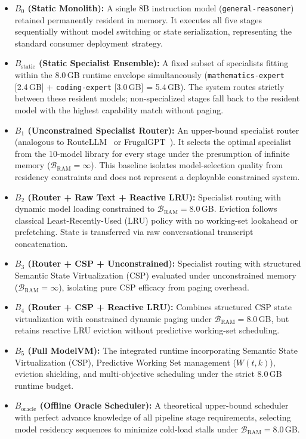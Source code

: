 \begin{itemize}
    \item \textbf{$B_0$ (Static Monolith):} A single 8B instruction model (\texttt{general-reasoner}) retained permanently resident in memory. It executes all five stages sequentially without model switching or state serialization, representing the standard consumer deployment strategy.
    \item \textbf{$B_{\text{static}}$ (Static Specialist Ensemble):} A fixed subset of specialists fitting within the 8.0\,GB runtime envelope simultaneously (\texttt{mathematics-expert} [2.4\,GB] + \texttt{coding-expert} [3.0\,GB] = 5.4\,GB). The system routes strictly between these resident models; non-specialized stages fall back to the resident model with the highest capability match without paging.
    \item \textbf{$B_1$ (Unconstrained Specialist Router):} An upper-bound specialist router (analogous to RouteLLM~\cite{ong2024routellm} or FrugalGPT~\cite{chen2023frugalgpt}). It selects the optimal specialist from the 10-model library for every stage under the presumption of infinite memory ($\mathcal{B}_{\text{RAM}} = \infty$). This baseline isolates model-selection quality from residency constraints and does not represent a deployable constrained system.
    \item \textbf{$B_2$ (Router + Raw Text + Reactive LRU):} Specialist routing with dynamic model loading constrained to $\mathcal{B}_{\text{RAM}} = 8.0$\,GB. Eviction follows classical Least-Recently-Used (LRU) policy with no working-set lookahead or prefetching. State is transferred via raw conversational transcript concatenation.
    \item \textbf{$B_3$ (Router + CSP + Unconstrained):} Specialist routing with structured Semantic State Virtualization (CSP) evaluated under unconstrained memory ($\mathcal{B}_{\text{RAM}} = \infty$), isolating pure CSP efficacy from paging overhead.
    \item \textbf{$B_4$ (Router + CSP + Reactive LRU):} Combines structured CSP state virtualization with constrained dynamic paging under $\mathcal{B}_{\text{RAM}} = 8.0$\,GB, but retains reactive LRU eviction without predictive working-set scheduling.
    \item \textbf{$B_5$ (Full ModelVM):} The integrated runtime incorporating Semantic State Virtualization (CSP), Predictive Working Set management ($W(t, k)$), eviction shielding, and multi-objective scheduling under the strict 8.0\,GB runtime budget.
    \item \textbf{$B_{\text{oracle}}$ (Offline Oracle Scheduler):} A theoretical upper-bound scheduler with perfect advance knowledge of all pipeline stage requirements, selecting model residency sequences to minimize cold-load stalls under $\mathcal{B}_{\text{RAM}} = 8.0$\,GB.
\end{itemize}

